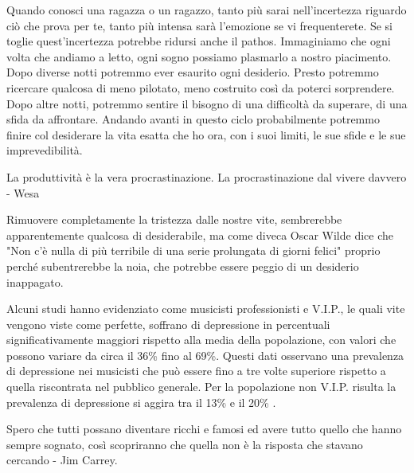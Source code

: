 \documentclass[12pt]{book} %
\begin{document}
Quando conosci una ragazza o un ragazzo, tanto più sarai nell'incertezza riguardo ciò che prova per te, tanto più intensa sarà l'emozione se vi frequenterete. Se si toglie quest'incertezza potrebbe ridursi anche il pathos.
Immaginiamo che ogni volta che andiamo a letto, ogni sogno possiamo plasmarlo a nostro piacimento. Dopo diverse notti potremmo ever esaurito ogni desiderio. Presto potremmo ricercare qualcosa di meno pilotato, meno costruito così da poterci sorprendere. Dopo altre notti, potremmo sentire il bisogno di una difficoltà da superare, di una sfida da affrontare. Andando avanti in questo ciclo probabilmente potremmo finire col desiderare la vita esatta che ho ora, con i suoi limiti, le sue sfide e le sue imprevedibilità.

La produttività è la vera procrastinazione. La procrastinazione dal vivere davvero - Wesa 

Rimuovere completamente la tristezza dalle nostre vite, sembrerebbe apparentemente qualcosa di desiderabile, ma come diveca Oscar Wilde dice che "Non c'è nulla di più terribile di una serie prolungata di giorni felici" proprio perché subentrerebbe la noia, che potrebbe essere peggio di un desiderio inappagato.

Alcuni studi hanno evidenziato come musicisti professionisti e V.I.P., le quali vite vengono viste come perfette, soffrano di depressione in percentuali significativamente maggiori rispetto alla media della popolazione, con valori che possono variare da circa il 36\% fino al 69\%. Questi dati osservano una prevalenza di depressione nei musicisti che può essere fino a tre volte superiore rispetto a quella riscontrata nel pubblico generale. Per la popolazione non V.I.P. risulta la prevalenza di depressione si aggira tra il 13\% e il 20\%  .

Spero che tutti possano diventare ricchi e famosi ed avere tutto quello che hanno sempre sognato, così scopriranno che
quella non è la risposta che stavano cercando - Jim Carrey.
\end{document}

